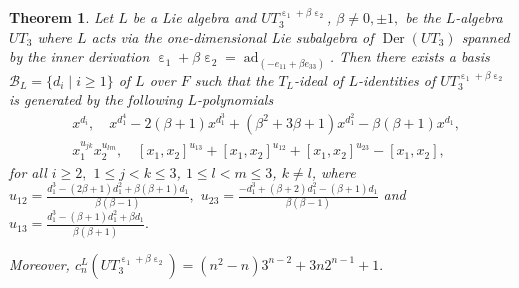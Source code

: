 \documentclass[a4paper,reqno]{amsart}
\newtheorem{theorem}{Theorem}
\theoremstyle{definition}
\numberwithin{equation}{section}
\numberwithin{theorem}{section}
\DeclareMathOperator{\e}{\varepsilon}
\DeclareMathOperator{\ad}{ad}
\DeclareMathOperator{\D}{Der}
\begin{document}
\begin{theorem} \label{teo: Id^L UT_3 e1+betae2}
   Let $L$ be a Lie algebra and $UT_3^{\e_1+\beta\e_2}$, $\beta\neq 0,\pm 1,$  be the $L$-algebra $UT_3$ where $L$ acts via the one-dimensional Lie subalgebra of $\D(UT_3)$ spanned by the inner derivation  $\e_1+\beta\e_2 =\ad_{(-e_{11}+\beta e_{33})}$. Then 
there exists a basis $\mathcal{B}_L=\{d_i \mid i \geq 1\}$ of $L$ over $F$ such that 
   the $T_L$-ideal of $L$-identities of $UT_3^{\e_1+\beta\e_2}$ is generated by the following $L$-polynomials
    \begin{align*}
       & x^{d_i}, \quad  x^{d_1^4}- 2(\beta+1)x^{d_1^3}+(\beta^2 + 3 \beta +1) x^{d_1^2}- \beta(\beta+1) x^{d_1},\\
     &  x_1^{u_{jk}}x_2^{u_{lm}}, \quad  [x_1,x_2]^{u_{13}}+ [x_1,x_2]^{u_{12}} + [x_1,x_2]^{u_{23}} - [x_1,x_2],
    \end{align*}
for all $i\geq 2,$ $1\leq j<k \leq 3$, $1\leq l < m\leq 3$, $k\neq l$,
where
$u_{12}=\frac{d_1^3- (2\beta+1)d_1^2+\beta(\beta+1)d_1}{\beta(\beta-1)},$ $ u_{23}=\frac{-d_1^3+(\beta+2)d_1^2-(\beta+1)d_1}{\beta(\beta-1)}$ and  $u_{13}=\frac{d_1^3-(\beta+1)d_1^2+\beta d_1}{\beta(\beta+1)}.$ 

Moreover, $c_n^L(UT_3^{\e_1 +\beta\e_2})= (n^2-n)3^{n-2}+3n2^{n-1}+1.$
\end{theorem}
\end{document}
